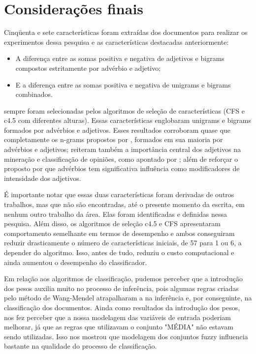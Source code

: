 \documentclass[template.tex]{subfiles}
\begin{document}
\section{Considerações finais}

Cinqüenta e sete características foram extraídas dos documentos para realizar os experimentos dessa pesquisa e as características destacadas anteriormente: 

\begin{itemize}
\item A diferença entre as somas positiva e negativa de adjetivos e bigrams compostos estritamente por advérbio e adjetivo;
\item E a diferença entre as somas positiva e negativa de unigrams e bigrams combinados.
\end{itemize}

sempre foram selecionadas pelos algoritmos de seleção de características (CFS e c4.5 com diferentes alturas). Essas características englobaram unigrams e bigrams formados por advérbios e adjetivos. Esses resultados corroboram quase que completamente os n-grams propostos por , formados em sua maioria por advérbios e adjetivos; reiteram também a importância central dos adjetivos na mineração e classificação de opiniões, como apontado por ; além de reforçar o proposto por  que advérbios tem significativa influência como modificadores de intensidade dos adjetivos. 

É importante notar que essas duas características foram derivadas de outros trabalhos, mas que não são encontradas, até o presente momento da escrita, em nenhum outro trabalho da área. Elas foram identificadas e definidas nessa pesquisa. Além disso, os algoritmos de seleção c4.5 e CFS apresentaram comportamento semelhante em termos de desempenho e ambos conseguiram reduzir drasticamente o número de características iniciais, de 57 para 1 ou 6, a depender do algoritmo. Isso, antes de tudo, reduziu o custo computacional e ainda aumentou o desempenho do classificador. 

Em relação aos algoritmos de classificação, pudemos perceber que a introdução dos pesos auxilia muito no processo de inferência, pois algumas regras criadas pelo método de Wang-Mendel atrapalharam a na inferência e, por conseguinte, na classificação dos documentos. Ainda como resultados da introdução dos pesos, nos fez perceber que a nossa modelagem das variáveis de entrada poderiam melhorar, já que as regras que utilizavam o conjunto "MÉDIA" não estavam sendo utilizadas. Isso nos mostrou que modelagem dos conjuntos fuzzy influencia bastante na qualidade do processo de classificação.

\end{document}
